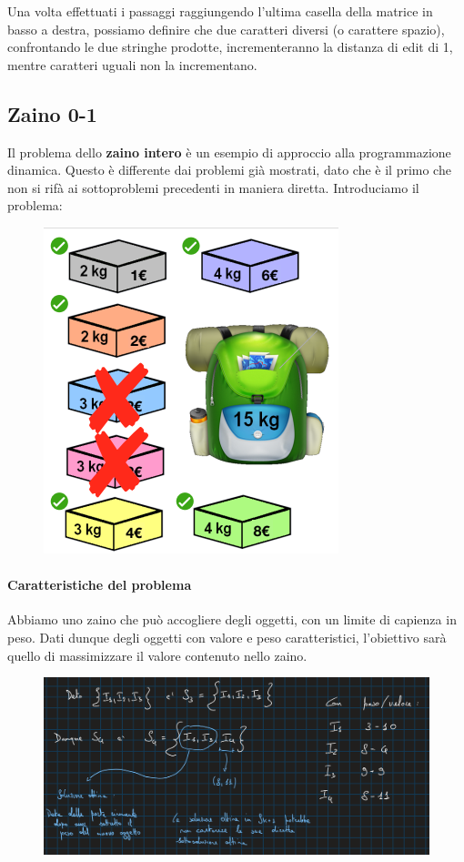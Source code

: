\documentclass{article}
\begin{document}
Una volta effettuati i passaggi raggiungendo l'ultima casella della matrice in basso a destra, possiamo definire che due caratteri diversi (o carattere spazio), confrontando le due stringhe prodotte, incrementeranno la distanza di edit di 1, mentre caratteri uguali non la incrementano.

\newpage

\subsection{Zaino 0-1} Il problema dello \textbf{zaino intero} è un esempio di approccio alla programmazione dinamica. Questo è differente dai problemi già mostrati, dato che è il primo che non si rifà ai sottoproblemi precedenti in maniera diretta. Introduciamo il problema:

\begin{figure}[htbp]
        \center
        \includegraphics[scale=0.4]{img/zaino1.png}
\end{figure}

\paragraph{Caratteristiche del problema} Abbiamo uno zaino che può accogliere degli oggetti, con un limite di capienza in peso. Dati dunque degli oggetti con valore e peso caratteristici, l'obiettivo sarà quello di massimizzare il valore contenuto nello zaino.

\begin{figure}[htbp]
        \center
        \includegraphics[scale=0.35]{img/zaino2.png}
\end{figure}
\end{document}
